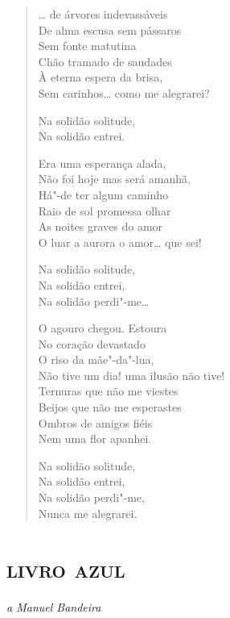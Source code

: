 

\begin{verse}
\ldots{} de árvores indevassáveis\\
De alma escusa sem pássaros\\
Sem fonte matutina\\
Chão tramado de saudades\\
À eterna espera da brisa,\\
Sem carinhos\ldots{} como me alegrarei?

Na solidão solitude,\\
Na solidão entrei.

Era uma esperança alada,\\
Não foi hoje mas será amanhã,\\
Há"-de ter algum caminho\\
Raio de sol promessa olhar\\
As noites graves do amor\\
O luar a aurora o amor\ldots{} que sei!

Na solidão solitude,\\
Na solidão entrei,\\
Na solidão perdi"-me\ldots{}

O agouro chegou. Estoura\\
No coração devastado\\
O riso da mãe"-da"-lua,\\
Não tive um dia! uma ilusão não tive!\\
Ternuras que não me viestes\\
Beijos que não me esperastes\\
Ombros de amigos fiéis\\
Nem uma flor apanhei.

Na solidão solitude,\\
Na solidão entrei,\\
Na solidão perdi"-me,\\
Nunca me alegrarei.
\end{verse}

\part{\textsc{livro azul}}


\begin{flushright}
\emph{a Manuel Bandeira}
\end{flushright}

